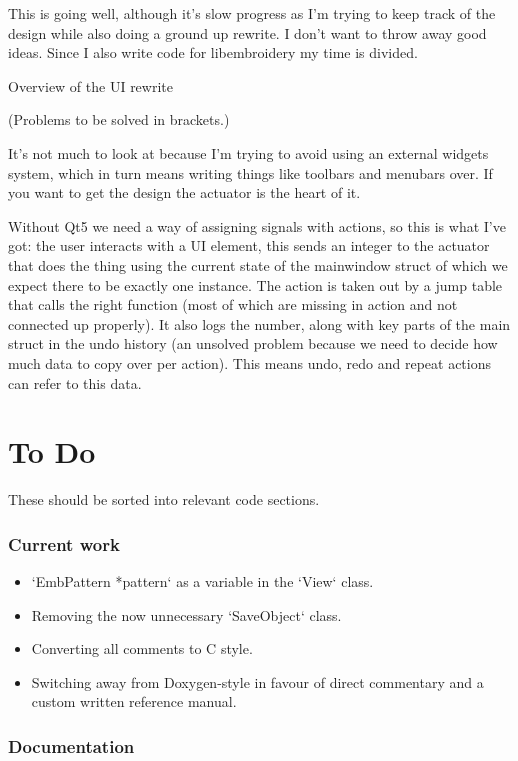 \documentclass[a4paper]{report}
\begin{document}
This is going well, although it's slow progress as I'm trying to keep track of
the design while also doing a ground up rewrite. I don't want to throw away good
ideas. Since I also write code for libembroidery my time is divided.

Overview of the UI rewrite

(Problems to be solved in brackets.)

It's not much to look at because I'm trying to avoid using an external
widgets system, which in turn means writing things like toolbars and menubars
over. If you want to get the design the actuator is the heart of it.

Without Qt5 we need a way of assigning signals with actions, so this is what
I've got: the user interacts with a UI element, this sends an integer to the
actuator that does the thing using the current state of the mainwindow struct
of which we expect there to be exactly one instance. The action is taken out
by a jump table that calls the right function (most of which are missing in
action and not connected up properly). It also logs the number, along with
key parts of the main struct in the undo history (an unsolved problem because
we need to decide how much data to copy over per action). This means undo,
redo and repeat actions can refer to this data.

\chapter{To Do}

These should be sorted into relevant code sections.

\subsection{Current work}

\begin{itemize}
\item `EmbPattern *pattern` as a variable in the `View` class.
\item Removing the now unnecessary `SaveObject` class.
\item Converting all comments to C style.
\item Switching away from Doxygen-style in favour of direct commentary and a custom written reference manual.
\end{itemize}

\subsection{Documentation}
\end{document}
